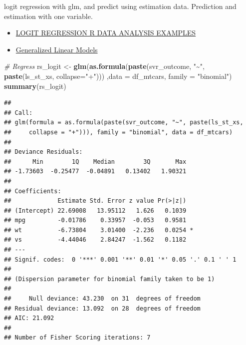 \documentclass[
]{book}
\newenvironment{Shaded}{\begin{snugshade}}{\end{snugshade}}
\newcommand{\CommentTok}[1]{\textcolor[rgb]{0.56,0.35,0.01}{\textit{#1}}}
\newcommand{\DataTypeTok}[1]{\textcolor[rgb]{0.13,0.29,0.53}{#1}}
\newcommand{\KeywordTok}[1]{\textcolor[rgb]{0.13,0.29,0.53}{\textbf{#1}}}
\newcommand{\NormalTok}[1]{#1}
\newcommand{\OperatorTok}[1]{\textcolor[rgb]{0.81,0.36,0.00}{\textbf{#1}}}
\newcommand{\StringTok}[1]{\textcolor[rgb]{0.31,0.60,0.02}{#1}}
\providecommand{\tightlist}{%
  \setlength{\itemsep}{0pt}\setlength{\parskip}{0pt}}
\begin{document}
logit regression with glm, and predict using estimation data. Prediction and estimation with one variable.

\begin{itemize}
\tightlist
\item
  \href{https://stats.idre.ucla.edu/r/dae/logit-regression/}{LOGIT REGRESSION R DATA ANALYSIS EXAMPLES}
\item
  \href{https://www.statmethods.net/advstats/glm.html}{Generalized Linear Models}
\end{itemize}

\begin{Shaded}
\begin{Highlighting}[]
\CommentTok{\# Regress}
\NormalTok{rs\_logit \textless{}{-}}\StringTok{ }\KeywordTok{glm}\NormalTok{(}\KeywordTok{as.formula}\NormalTok{(}\KeywordTok{paste}\NormalTok{(svr\_outcome, }\StringTok{"\textasciitilde{}"}\NormalTok{, }\KeywordTok{paste}\NormalTok{(ls\_st\_xs, }\DataTypeTok{collapse=}\StringTok{"+"}\NormalTok{)))}
\NormalTok{                ,}\DataTypeTok{data =}\NormalTok{ df\_mtcars, }\DataTypeTok{family =} \StringTok{"binomial"}\NormalTok{)}
\KeywordTok{summary}\NormalTok{(rs\_logit)}
\end{Highlighting}
\end{Shaded}

\begin{verbatim}
## 
## Call:
## glm(formula = as.formula(paste(svr_outcome, "~", paste(ls_st_xs, 
##     collapse = "+"))), family = "binomial", data = df_mtcars)
## 
## Deviance Residuals: 
##      Min        1Q    Median        3Q       Max  
## -1.73603  -0.25477  -0.04891   0.13402   1.90321  
## 
## Coefficients:
##             Estimate Std. Error z value Pr(>|z|)  
## (Intercept) 22.69008   13.95112   1.626   0.1039  
## mpg         -0.01786    0.33957  -0.053   0.9581  
## wt          -6.73804    3.01400  -2.236   0.0254 *
## vs          -4.44046    2.84247  -1.562   0.1182  
## ---
## Signif. codes:  0 '***' 0.001 '**' 0.01 '*' 0.05 '.' 0.1 ' ' 1
## 
## (Dispersion parameter for binomial family taken to be 1)
## 
##     Null deviance: 43.230  on 31  degrees of freedom
## Residual deviance: 13.092  on 28  degrees of freedom
## AIC: 21.092
## 
## Number of Fisher Scoring iterations: 7
\end{verbatim}

\begin{Shaded}
\end{Shaded}
\end{document}
